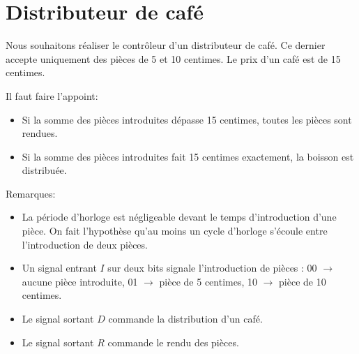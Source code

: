 \documentclass[a4paper,10pt]{exam}
\begin{document}
\section{Distributeur de café}
Nous souhaitons réaliser le contrôleur d'un distributeur de café.
Ce dernier accepte uniquement des pièces de 5 et 10 centimes.
Le prix d'un café est de 15 centimes.

Il faut faire l'appoint:
\begin{itemize}
  \item Si la somme des pièces introduites dépasse 15 centimes, toutes les
    pièces sont rendues.
  \item Si la somme des pièces introduites fait 15 centimes exactement, la
    boisson est distribuée.
\end{itemize}

Remarques:
\begin{itemize}
  \item La période d'horloge est négligeable devant le temps d'introduction
    d'une pièce. On fait l'hypothèse qu'au moins un cycle d'horloge s'écoule
    entre l'introduction de deux pièces.
  \item Un signal entrant $I$ sur deux bits signale l'introduction de pièces :
    00 $\rightarrow$ aucune pièce introduite, 01 $\rightarrow$ pièce de 5
    centimes, 10 $\rightarrow$ pièce de 10 centimes.
  \item Le signal sortant $D$ commande la  distribution d'un café.
  \item Le signal sortant $R$ commande le rendu des pièces.
\end{itemize}
\end{document}
